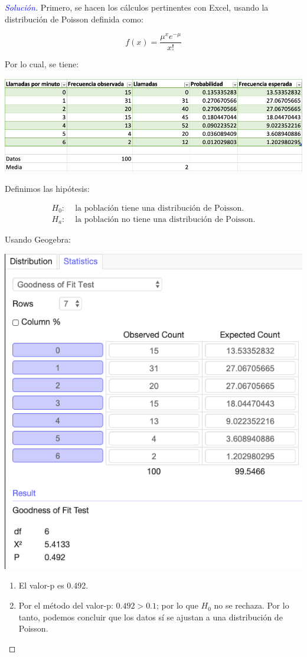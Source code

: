 \documentclass[a4paper,12pt]{article}
\newenvironment{solution}
  {\renewcommand\qedsymbol{$\square$}\begin{proof}[\textcolor{blue}{Solución}]}
  {\end{proof}}
\begin{document}
\begin{solution}
Primero, se hacen los cálculos pertinentes con Excel, usando la distribución de Poisson definida como: 

$$f(x)=\frac{\mu^xe^{-\mu}}{x!}$$

Por lo cual, se tiene: 
\begin{center}
    \includegraphics[scale=0.45]{images/Screen Shot 2021-05-11 at 17.19.28.png}
\end{center}

Definimos las hipótesis: 

\begin{align*}
    H_0: & \text{ la población tiene una distribución de Poisson.}\\ 
    H_a: & \text{  la población no tiene una distribución de Poisson.}
\end{align*}

Usando Geogebra: 
\begin{center}
    \includegraphics[scale=0.45]{images/Screen Shot 2021-05-11 at 17.21.02.png}
\end{center}

\begin{enumerate}
    \item El valor-p es 0.492. 
    \item Por el método del valor-p: $0.492>0.1$; por lo que $H_0$ no se rechaza. Por lo tanto, podemos concluir que los datos sí se ajustan a una distribución de Poisson.
\end{enumerate}
\end{solution}

%
%
\end{document}
